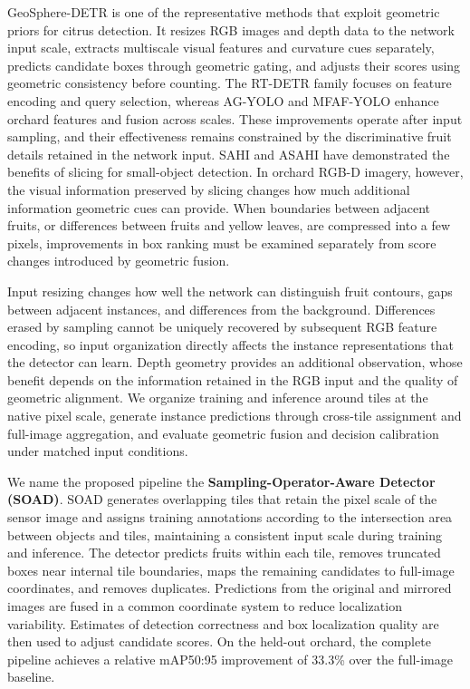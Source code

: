 \documentclass[11pt,a4paper]{article}
\begin{document}
GeoSphere-DETR \cite{geosphere} is one of the representative methods that exploit geometric priors for citrus detection. It resizes RGB images and depth data to the network input scale, extracts multiscale visual features and curvature cues separately, predicts candidate boxes through geometric gating, and adjusts their scores using geometric consistency before counting. The RT-DETR family \cite{rtdetr,rtdetrv2} focuses on feature encoding and query selection, whereas AG-YOLO \cite{agyolo} and MFAF-YOLO \cite{mfaf} enhance orchard features and fusion across scales. These improvements operate after input sampling, and their effectiveness remains constrained by the discriminative fruit details retained in the network input. SAHI \cite{sahi} and ASAHI \cite{asahi} have demonstrated the benefits of slicing for small-object detection. In orchard RGB-D imagery, however, the visual information preserved by slicing changes how much additional information geometric cues can provide. When boundaries between adjacent fruits, or differences between fruits and yellow leaves, are compressed into a few pixels, improvements in box ranking must be examined separately from score changes introduced by geometric fusion.

Input resizing changes how well the network can distinguish fruit contours, gaps between adjacent instances, and differences from the background. Differences erased by sampling cannot be uniquely recovered by subsequent RGB feature encoding, so input organization directly affects the instance representations that the detector can learn. Depth geometry provides an additional observation, whose benefit depends on the information retained in the RGB input and the quality of geometric alignment. We organize training and inference around tiles at the native pixel scale, generate instance predictions through cross-tile assignment and full-image aggregation, and evaluate geometric fusion and decision calibration under matched input conditions.

We name the proposed pipeline the \textbf{Sampling-Operator-Aware Detector (SOAD)}. SOAD generates overlapping tiles that retain the pixel scale of the sensor image and assigns training annotations according to the intersection area between objects and tiles, maintaining a consistent input scale during training and inference. The detector predicts fruits within each tile, removes truncated boxes near internal tile boundaries, maps the remaining candidates to full-image coordinates, and removes duplicates. Predictions from the original and mirrored images are fused in a common coordinate system to reduce localization variability. Estimates of detection correctness and box localization quality are then used to adjust candidate scores. On the held-out orchard, the complete pipeline achieves a relative mAP50:95 improvement of 33.3\% over the full-image baseline.
\end{document}
